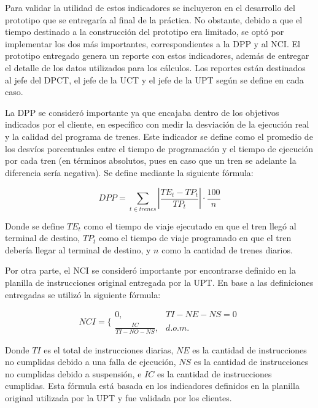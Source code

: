 \documentclass[oneside,12pt, letterpaper, titlepage]{book}
\begin{document}
Para validar la utilidad de estos indicadores se incluyeron en el desarrollo del prototipo que se entregaría al final de la práctica. No obstante, debido a que el tiempo destinado a la construcción del prototipo era limitado, se optó por implementar los dos más importantes, correspondientes a la DPP y al NCI. El prototipo entregado genera un reporte con estos indicadores, además de entregar el detalle de los datos utilizados para los cálculos. Los reportes están destinados al jefe del DPCT, el jefe de la UCT y el jefe de la UPT según se define en cada caso.

La DPP se consideró importante ya que encajaba dentro de los objetivos indicados por el cliente, en específico con medir la desviación de la ejecución real y la calidad del programa de trenes. Este indicador se define como el promedio de los desvíos porcentuales entre el tiempo de programación y el tiempo de ejecución por cada tren  (en términos absolutos, pues en caso que un tren se adelante la diferencia sería negativa). Se define mediante la siguiente fórmula:

\begin{equation}
DPP = \sum_{t \in trenes}
{\left | {\frac{TE_{t}-TP_{t}}{TP_{t}}} \right |} \cdot \frac{100}{n}
\end{equation}

Donde se define $TE_{t}$ como el tiempo de viaje ejecutado en que el tren llegó al terminal de destino, $TP_{t}$ como el tiempo de viaje programado en que el tren debería llegar al terminal de destino, y $n$ como la cantidad de trenes diarios. 

Por otra parte, el NCI se consideró importante por encontrarse definido en la planilla de instrucciones original entregada por la UPT. En base a las definiciones entregadas se utilizó la siguiente fórmula:

\begin{equation}
NCI = \Bigg\{ \begin{matrix} 
 0, & TI-NE-NS = 0  
\\
 \frac{IC}{TI-NO-NS}, & d.o.m. 
 \end{matrix}
\end{equation}

Donde $TI$ es el total de instrucciones diarias, $NE$ es la cantidad de instrucciones no cumplidas debido a una falla de ejecución, $NS$ es la cantidad de instrucciones no cumplidas debido a suspensión, e $IC$ es la cantidad de instrucciones cumplidas. Esta fórmula está basada en los indicadores definidos en la planilla original utilizada por la UPT y fue validada por los clientes.
\end{document}
